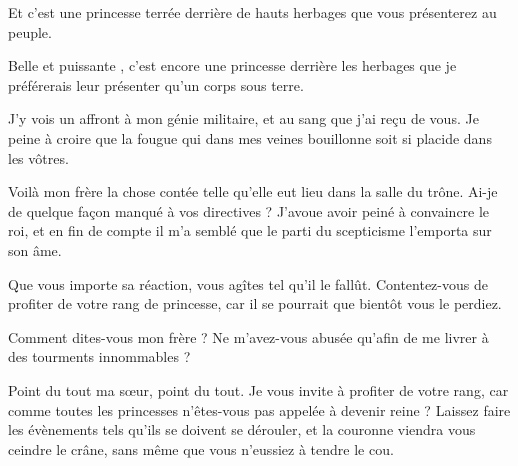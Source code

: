 \begin{drama}
  \elaspeaks Et c’est une princesse terrée derrière de hauts herbages que vous présenterez au peuple.

  \roispeaks Belle et puissante \princesse{}, c’est encore une princesse derrière les herbages que je préférerais leur présenter qu’un corps sous terre.

  \elaspeaks J’y vois un affront à mon génie militaire, et au sang que j’ai reçu de vous. Je peine à croire que la fougue qui dans mes veines bouillonne soit si placide dans les vôtres.


\end{drama}

\scene

\StageDirII{\elena, \ela}

%

\begin{drama}
  \elaspeaks Voilà mon frère la chose contée telle qu’elle eut lieu dans la salle du trône. Ai-je de quelque façon manqué à vos directives ? J’avoue avoir peiné à convaincre le roi, et en fin de compte il m’a semblé que le parti du scepticisme l’emporta sur son âme.

  \elenaspeaks Que vous importe sa réaction, vous agîtes tel qu’il le fallût. Contentez-vous de profiter de votre rang de princesse, car il se pourrait que bientôt vous le perdiez.

  \elaspeaks Comment dites-vous mon frère ? Ne m’avez-vous abusée qu’afin de me livrer à des tourments innommables ?

  \elenaspeaks Point du tout ma sœur, point du tout. Je vous invite à profiter de votre rang, car comme toutes les princesses n’êtes-vous pas appelée à devenir reine ? Laissez faire les évènements tels qu’ils se doivent se dérouler, et la couronne viendra vous ceindre le crâne, sans même que vous n’eussiez à tendre le cou.
\end{drama}

\scene

\StageDirII{\reine, \roi}


